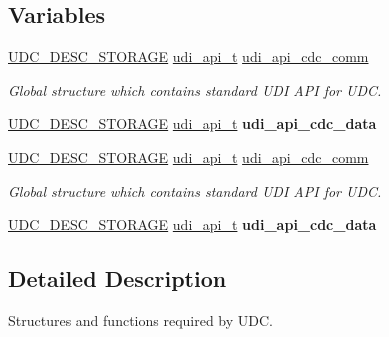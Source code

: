 \subsection*{Variables}
\begin{DoxyCompactItemize}
\item 
\hyperlink{group__udc__desc__group_gae086959cec07a2e71ab069e25a51764f}{U\-D\-C\-\_\-\-D\-E\-S\-C\-\_\-\-S\-T\-O\-R\-A\-G\-E} \hyperlink{structudi__api__t}{udi\-\_\-api\-\_\-t} \hyperlink{group__udi__cdc__group__udc_gad7b0a90350a1f1a7c62fab1a749bf687}{udi\-\_\-api\-\_\-cdc\-\_\-comm}
\begin{DoxyCompactList}\small\item\em Global structure which contains standard U\-D\-I A\-P\-I for U\-D\-C. \end{DoxyCompactList}\item 
\hyperlink{group__udc__desc__group_gae086959cec07a2e71ab069e25a51764f}{U\-D\-C\-\_\-\-D\-E\-S\-C\-\_\-\-S\-T\-O\-R\-A\-G\-E} \hyperlink{structudi__api__t}{udi\-\_\-api\-\_\-t} {\bfseries udi\-\_\-api\-\_\-cdc\-\_\-data}
\item 
\hypertarget{group__udi__cdc__group__udc_gad7b0a90350a1f1a7c62fab1a749bf687}{\hyperlink{group__udc__desc__group_gae086959cec07a2e71ab069e25a51764f}{U\-D\-C\-\_\-\-D\-E\-S\-C\-\_\-\-S\-T\-O\-R\-A\-G\-E} \hyperlink{structudi__api__t}{udi\-\_\-api\-\_\-t} \hyperlink{group__udi__cdc__group__udc_gad7b0a90350a1f1a7c62fab1a749bf687}{udi\-\_\-api\-\_\-cdc\-\_\-comm}}\label{group__udi__cdc__group__udc_gad7b0a90350a1f1a7c62fab1a749bf687}

\begin{DoxyCompactList}\small\item\em Global structure which contains standard U\-D\-I A\-P\-I for U\-D\-C. \end{DoxyCompactList}\item 
\hypertarget{group__udi__cdc__group__udc_ga3f85c229cc3218b75cb4844b8e9ad2d7}{\hyperlink{group__udc__desc__group_gae086959cec07a2e71ab069e25a51764f}{U\-D\-C\-\_\-\-D\-E\-S\-C\-\_\-\-S\-T\-O\-R\-A\-G\-E} \hyperlink{structudi__api__t}{udi\-\_\-api\-\_\-t} {\bfseries udi\-\_\-api\-\_\-cdc\-\_\-data}}\label{group__udi__cdc__group__udc_ga3f85c229cc3218b75cb4844b8e9ad2d7}

\end{DoxyCompactItemize}


\subsection{Detailed Description}
Structures and functions required by U\-D\-C. 

